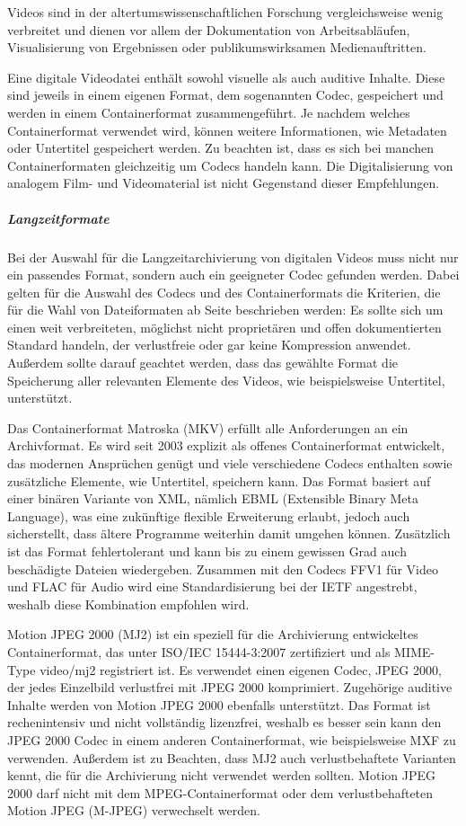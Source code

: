Videos sind in der altertumswissenschaftlichen Forschung vergleichsweise wenig verbreitet und dienen vor allem der Dokumentation von Arbeitsabläufen, Visualisierung von Ergebnissen oder publikumswirksamen Medienauftritten.

Eine digitale Videodatei enthält sowohl visuelle als auch auditive Inhalte. Diese sind jeweils in einem eigenen Format, dem sogenannten Codec, gespeichert und werden in einem Containerformat zusammengeführt. Je nachdem welches Containerformat verwendet wird, können weitere Informationen, wie Metadaten oder Untertitel gespeichert werden. Zu beachten ist, dass es sich bei manchen Containerformaten gleichzeitig um Codecs handeln kann. Die Digitalisierung von analogem Film- und Videomaterial ist nicht Gegenstand dieser Empfehlungen.

\subparagraph{Langzeitformate} Bei der Auswahl für die Langzeitarchivierung von digitalen Videos muss nicht nur ein passendes Format, sondern auch ein geeigneter Codec gefunden werden. Dabei gelten für die Auswahl des Codecs und des Containerformats die Kriterien, die für die Wahl von Dateiformaten ab Seite \pageref{dateiformate} beschrieben werden: Es sollte sich um einen weit verbreiteten, möglichst nicht proprietären und offen dokumentierten Standard handeln, der verlustfreie oder gar keine Kompression anwendet. Außerdem sollte darauf geachtet werden, dass das gewählte Format die Speicherung aller relevanten Elemente des Videos, wie beispielsweise Untertitel, unterstützt.

Das Containerformat Matroska (MKV) erfüllt alle Anforderungen an ein Archivformat. Es wird seit 2003 explizit als offenes Containerformat entwickelt, das modernen Ansprüchen genügt und viele verschiedene Codecs enthalten sowie zusätzliche Elemente, wie Untertitel, speichern kann. Das Format basiert auf einer binären Variante von XML, nämlich EBML (Extensible Binary Meta Language), was eine zukünftige flexible Erweiterung erlaubt, jedoch auch sicherstellt, dass ältere Programme weiterhin damit umgehen können. Zusätzlich ist das Format fehlertolerant und kann bis zu einem gewissen Grad auch beschädigte Dateien wiedergeben. Zusammen mit den Codecs FFV1 für Video und FLAC für Audio wird eine Standardisierung bei der IETF angestrebt, weshalb diese Kombination empfohlen wird.

Motion JPEG 2000 (MJ2) ist ein speziell für die Archivierung entwickeltes Containerformat, das unter ISO/IEC 15444-3:2007 zertifiziert und als MIME-Type video/mj2 registriert ist. Es verwendet einen eigenen Codec, JPEG 2000, der jedes Einzelbild verlustfrei mit JPEG 2000 komprimiert. Zugehörige auditive Inhalte werden von Motion JPEG 2000 ebenfalls unterstützt. Das Format ist rechenintensiv und nicht vollständig lizenzfrei, weshalb es besser sein kann den JPEG 2000 Codec in einem anderen Containerformat, wie beispielsweise MXF zu verwenden. Außerdem ist zu Beachten, dass MJ2 auch verlustbehaftete Varianten kennt, die für die Archivierung nicht verwendet werden sollten. Motion JPEG 2000 darf nicht mit dem MPEG-Containerformat oder dem verlustbehafteten Motion JPEG (M-JPEG) verwechselt werden.


